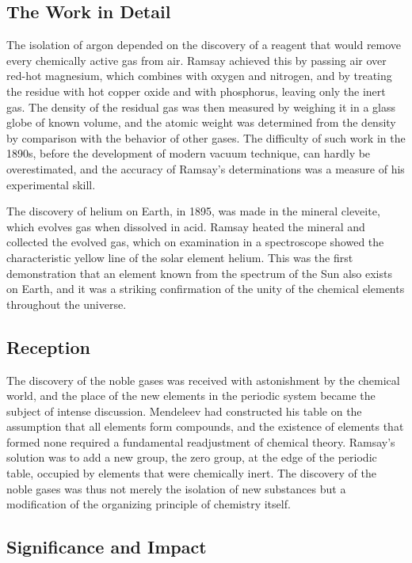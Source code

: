 \subsection*{The Work in Detail}

The isolation of argon depended on the discovery of a reagent that would remove every chemically active gas from air. Ramsay achieved this by passing air over red-hot magnesium, which combines with oxygen and nitrogen, and by treating the residue with hot copper oxide and with phosphorus, leaving only the inert gas. The density of the residual gas was then measured by weighing it in a glass globe of known volume, and the atomic weight was determined from the density by comparison with the behavior of other gases. The difficulty of such work in the 1890s, before the development of modern vacuum technique, can hardly be overestimated, and the accuracy of Ramsay's determinations was a measure of his experimental skill.

The discovery of helium on Earth, in 1895, was made in the mineral cleveite, which evolves gas when dissolved in acid. Ramsay heated the mineral and collected the evolved gas, which on examination in a spectroscope showed the characteristic yellow line of the solar element helium. This was the first demonstration that an element known from the spectrum of the Sun also exists on Earth, and it was a striking confirmation of the unity of the chemical elements throughout the universe.

\subsection*{Reception}

The discovery of the noble gases was received with astonishment by the chemical world, and the place of the new elements in the periodic system became the subject of intense discussion. Mendeleev had constructed his table on the assumption that all elements form compounds, and the existence of elements that formed none required a fundamental readjustment of chemical theory. Ramsay's solution was to add a new group, the zero group, at the edge of the periodic table, occupied by elements that were chemically inert. The discovery of the noble gases was thus not merely the isolation of new substances but a modification of the organizing principle of chemistry itself.

\subsection*{Significance and Impact}

